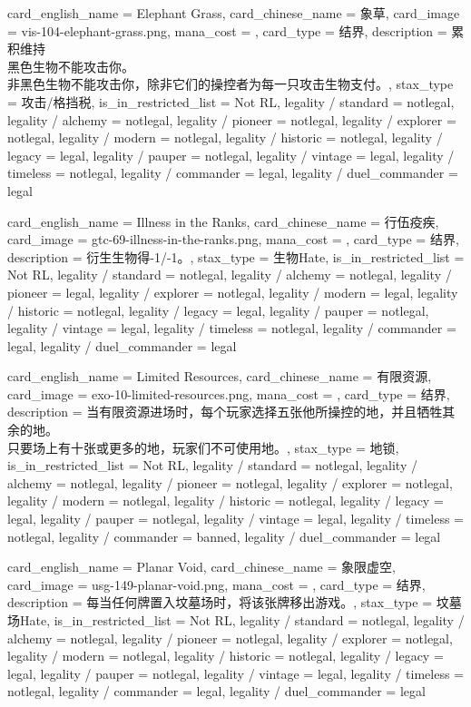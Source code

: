 \documentclass[lang = cn, color = black, 10pt]{AllThatStax}
\begin{document}
\card
{
	card_english_name = {Elephant Grass},
	card_chinese_name = {象草},
	card_image = vis-104-elephant-grass.png,
	mana_cost = ,
	card_type = 结界,
	description = {累积维持\\
黑色生物不能攻击你。\\
非黑色生物不能攻击你，除非它们的操控者为每一只攻击生物支付。},
	stax_type = 攻击/格挡税,
	is_in_restricted_list = Not RL,
	legality / standard = notlegal,
	legality / alchemy = notlegal,
	legality / pioneer = notlegal,
	legality / explorer = notlegal,
	legality / modern = notlegal,
	legality / historic = notlegal,
	legality / legacy = legal,
	legality / pauper = notlegal,
	legality / vintage = legal,
	legality / timeless = notlegal,
	legality / commander = legal,
	legality / duel_commander = legal
}

\card
{
	card_english_name = {Illness in the Ranks},
	card_chinese_name = {行伍疫疾},
	card_image = gtc-69-illness-in-the-ranks.png,
	mana_cost = ,
	card_type = 结界,
	description = {衍生生物得-1/-1。},
	stax_type = 生物Hate,
	is_in_restricted_list = Not RL,
	legality / standard = notlegal,
	legality / alchemy = notlegal,
	legality / pioneer = legal,
	legality / explorer = notlegal,
	legality / modern = legal,
	legality / historic = notlegal,
	legality / legacy = legal,
	legality / pauper = notlegal,
	legality / vintage = legal,
	legality / timeless = notlegal,
	legality / commander = legal,
	legality / duel_commander = legal
}

\card
{
	card_english_name = {Limited Resources},
	card_chinese_name = {有限资源},
	card_image = exo-10-limited-resources.png,
	mana_cost = ,
	card_type = 结界,
	description = {当有限资源进场时，每个玩家选择五张他所操控的地，并且牺牲其余的地。\\
只要场上有十张或更多的地，玩家们不可使用地。},
	stax_type = 地锁,
	is_in_restricted_list = Not RL,
	legality / standard = notlegal,
	legality / alchemy = notlegal,
	legality / pioneer = notlegal,
	legality / explorer = notlegal,
	legality / modern = notlegal,
	legality / historic = notlegal,
	legality / legacy = legal,
	legality / pauper = notlegal,
	legality / vintage = legal,
	legality / timeless = notlegal,
	legality / commander = banned,
	legality / duel_commander = legal
}

\card
{
	card_english_name = {Planar Void},
	card_chinese_name = {象限虚空},
	card_image = usg-149-planar-void.png,
	mana_cost = ,
	card_type = 结界,
	description = {每当任何牌置入坟墓场时，将该张牌移出游戏。},
	stax_type = 坟墓场Hate,
	is_in_restricted_list = Not RL,
	legality / standard = notlegal,
	legality / alchemy = notlegal,
	legality / pioneer = notlegal,
	legality / explorer = notlegal,
	legality / modern = notlegal,
	legality / historic = notlegal,
	legality / legacy = legal,
	legality / pauper = notlegal,
	legality / vintage = legal,
	legality / timeless = notlegal,
	legality / commander = legal,
	legality / duel_commander = legal
}
\end{document}
